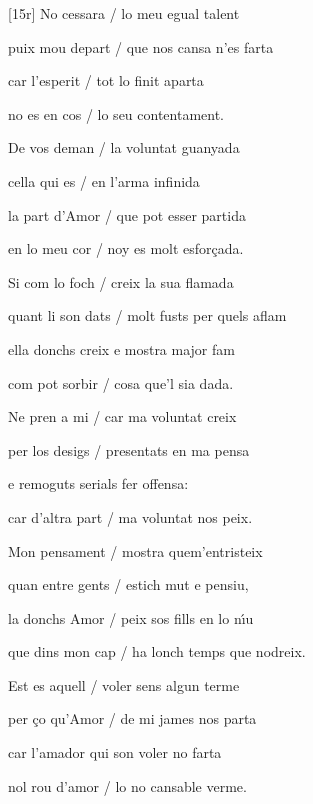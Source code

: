 \documentclass[12pt]{article}
\begin{document}
\begin{estrofa}

 [15r] No cessara / lo meu egual talent

 puix mou depart / que nos cansa n'es farta

 car l'esperit / tot lo finit aparta

 no es en cos / lo seu contentament.

 De vos deman / la voluntat guanyada

 cella qui es / en l'arma infinida

 la part d'Amor / que pot esser partida

 en lo meu cor / noy es molt esfor\c{c}ada.

\end{estrofa}



\begin{estrofa}

 Si com lo foch / creix la sua flamada

 quant li son dats / molt fusts per quels aflam

 ella donchs creix e mostra major fam

 com pot sorbir / cosa que'l sia dada.

 Ne pren a mi / car ma voluntat creix

 per los desigs / presentats en ma pensa

 e remoguts serials fer offensa:

 car d'altra part / ma voluntat nos peix.

\end{estrofa}



\begin{estrofa}

 Mon pensament / mostra quem'entristeix

 quan entre gents / estich mut e pensiu,

 la donchs Amor / peix sos fills en lo n\'{\i}u

 que dins mon cap / ha lonch temps  que nodreix.

 Est es aquell / voler sens algun terme

 per \c{c}o qu'Amor / de mi james nos parta

 car l'amador qui son voler no farta

 nol rou d'amor / lo no cansable verme.

\end{estrofa}
\end{document}
